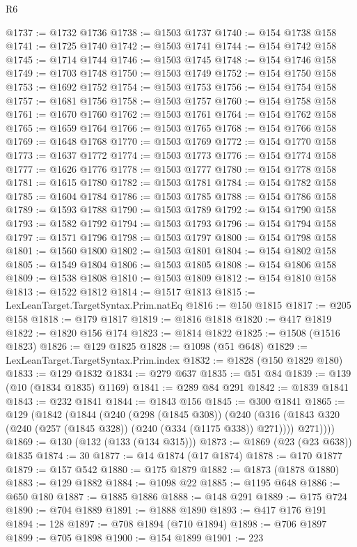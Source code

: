 \begin{lexlean}{R6}
\begin{coremodule}
{{{{{{{{{{{{{{{{{{{{{{{{{{{{{{{{{{{{{{{{{{{{{{{{{{{{{{{{{{{{{{{{{{{{{{{{@1737 := @1732 @1736
@1738 := @1503 @1737
@1740 := @154 @1738 @158
@1741 := @1725 @1740
@1742 := @1503 @1741
@1744 := @154 @1742 @158
@1745 := @1714 @1744
@1746 := @1503 @1745
@1748 := @154 @1746 @158
@1749 := @1703 @1748
@1750 := @1503 @1749
@1752 := @154 @1750 @158
@1753 := @1692 @1752
@1754 := @1503 @1753
@1756 := @154 @1754 @158
@1757 := @1681 @1756
@1758 := @1503 @1757
@1760 := @154 @1758 @158
@1761 := @1670 @1760
@1762 := @1503 @1761
@1764 := @154 @1762 @158
@1765 := @1659 @1764
@1766 := @1503 @1765
@1768 := @154 @1766 @158
@1769 := @1648 @1768
@1770 := @1503 @1769
@1772 := @154 @1770 @158
@1773 := @1637 @1772
@1774 := @1503 @1773
@1776 := @154 @1774 @158
@1777 := @1626 @1776
@1778 := @1503 @1777
@1780 := @154 @1778 @158
@1781 := @1615 @1780
@1782 := @1503 @1781
@1784 := @154 @1782 @158
@1785 := @1604 @1784
@1786 := @1503 @1785
@1788 := @154 @1786 @158
@1789 := @1593 @1788
@1790 := @1503 @1789
@1792 := @154 @1790 @158
@1793 := @1582 @1792
@1794 := @1503 @1793
@1796 := @154 @1794 @158
@1797 := @1571 @1796
@1798 := @1503 @1797
@1800 := @154 @1798 @158
@1801 := @1560 @1800
@1802 := @1503 @1801
@1804 := @154 @1802 @158
@1805 := @1549 @1804
@1806 := @1503 @1805
@1808 := @154 @1806 @158
@1809 := @1538 @1808
@1810 := @1503 @1809
@1812 := @154 @1810 @158
@1813 := @1522 @1812
@1814 := @1517 @1813
@1815 := LexLeanTarget.TargetSyntax.Prim.natEq
@1816 := @150 @1815
@1817 := @205 @158
@1818 := @179 @1817
@1819 := @1816 @1818
@1820 := @417 @1819
@1822 := @1820 @156 @174
@1823 := @1814 @1822
@1825 := @1508 (@1516 @1823)
@1826 := @129 @1825
@1828 := @1098 (@51 @648)
@1829 := LexLeanTarget.TargetSyntax.Prim.index
@1832 := @1828 (@150 @1829 @180)
@1833 := @129 @1832
@1834 := @279 @637
@1835 := @51 @84
@1839 := @139 (@10 (@1834 @1835) @1169)
@1841 := @289 @84 @291
@1842 := @1839 @1841
@1843 := @232 @1841
@1844 := @1843 @156
@1845 := @300 @1841
@1865 := @129
    (@1842
      (@1844
        (@240
          (@298 (@1845 @308))
          (@240
            (@316 (@1843 @320 (@240 (@257 (@1845 @328)) (@240 (@334 (@1175 @338)) @271))))
            @271))))
@1869 := @130 (@132 (@133 (@134 @315)))
@1873 := @1869 (@23 (@23 @638)) @1835
@1874 := 30
@1877 := @14 @1874 (@17 @1874)
@1878 := @170 @1877
@1879 := @157 @542
@1880 := @175 @1879
@1882 := @1873 (@1878 @1880)
@1883 := @129 @1882
@1884 := @1098 @22
@1885 := @1195 @648
@1886 := @650 @180
@1887 := @1885 @1886
@1888 := @148 @291
@1889 := @175 @724
@1890 := @704 @1889
@1891 := @1888 @1890
@1893 := @417 @176 @191
@1894 := 128
@1897 := @708 @1894 (@710 @1894)
@1898 := @706 @1897
@1899 := @705 @1898
@1900 := @154 @1899
@1901 := 223
}}}}}}}}}}}}}}}}}}}}}}}}}}}}}}}}}}}}}}}}}}}}}}}}}}}}}}}}}}}}}}}}}}}}}}}}
\end{coremodule}
\end{lexlean}
